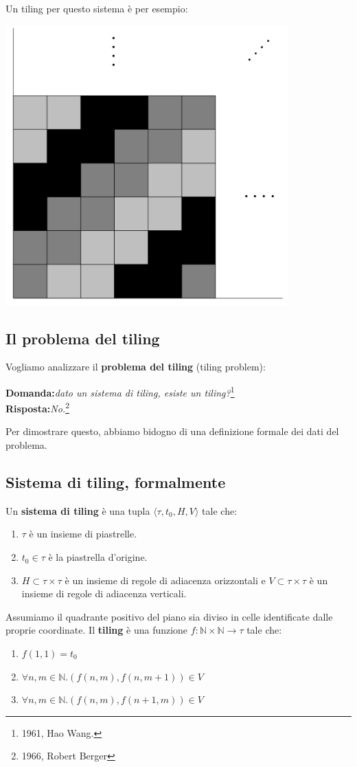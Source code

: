 \documentclass[a4paper, 12pt]{article}
\begin{document}
Un tiling per questo sistema \`e per esempio:
\begin{center}
\includegraphics[scale=0.5]{tiling3.png}
\end{center}
\subsection{Il problema del tiling}
Vogliamo analizzare il \textbf{problema del tiling} (tiling problem):
\begin{center}

\textbf{Domanda:}\emph{dato un sistema di tiling, esiste un tiling?}\footnote{1961, Hao Wang.}\\
\textbf{Risposta:}\emph{No.}\footnote{1966, Robert Berger}
\end{center}
Per dimostrare questo, abbiamo bidogno di una definizione formale dei dati del problema.
\subsection{Sistema di tiling, formalmente}
Un \textbf{sistema di tiling} \`e una tupla $\langle \tau, t_0, H, V \rangle$ tale che:
\begin{center}
\begin{enumerate}
\item $\tau$ \`e un insieme di piastrelle.
\item $t_0 \in \tau$ \`e la piastrella d'origine.
\item $H \subset \tau \times \tau$ \`e un insieme di regole di adiacenza orizzontali e $V \subset \tau \times \tau$ \`e un insieme di regole di adiacenza verticali.
\end{enumerate}
\end{center}
Assumiamo il quadrante positivo del piano sia diviso in celle identificate dalle proprie coordinate. Il \textbf{tiling} \`e una funzione $f: \mathbb{N} \times \mathbb{N} \rightarrow \tau$ tale che:
\begin{enumerate}
\item $f(1,1) = t_0$
\item $\forall n,m \in \mathbb{N}.(f(n,m),f(n,m+1)) \in V$
\item $\forall n,m \in \mathbb{N}.(f(n,m),f(n+1,m)) \in V$
\end{enumerate}
\end{document}

